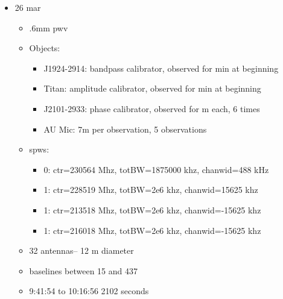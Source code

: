 \documentclass[a4paper]{tufte-handout}
\begin{document}
\begin{itemize}
	\item 26 mar
	      \begin{itemize}
	      	\item \abt .6mm pwv
	      	\item Objects:
	      	      \begin{itemize}
	      	      	\item J1924-2914: bandpass calibrator, observed for  min at beginning
	      	      	\item Titan: amplitude calibrator, observed for  min at beginning
	      	      	\item J2101-2933: phase calibrator, observed for  m each, 6 times
	      	      	\item AU Mic: \abt 7m per observation, 5 observations
	      	      \end{itemize}
	      	\item spws:
	      	      \begin{itemize}
	      	      	\item 0: ctr=230564 Mhz, totBW=1875000 khz, chanwid=488 kHz
	      	      	\item 1: ctr=228519 Mhz, totBW=2e6 khz, chanwid=15625 khz
	      	      	\item 1: ctr=213518 Mhz, totBW=2e6 khz, chanwid=-15625 khz
	      	      	\item 1: ctr=216018 Mhz, totBW=2e6 khz, chanwid=-15625 khz
	      	      \end{itemize}
	      	\item 32 antennas-- 12 m diameter
	      	\item baselines between 15 and 437
	      	\item 9:41:54 to 10:16:56 2102 seconds
	      \end{itemize}


\end{itemize}
\end{document}
